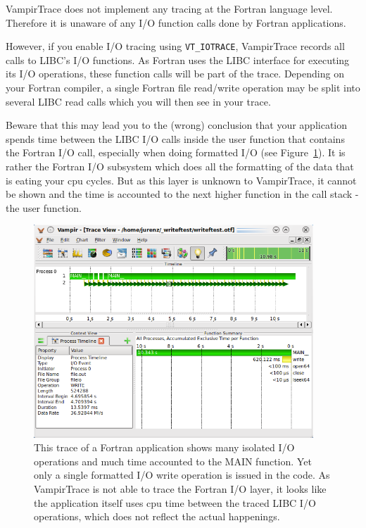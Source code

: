 \documentclass[a4paper,twoside,12pt,BCOR12mm]{scrbook}
\begin{document}
\begin{latexonly}
VampirTrace does not implement any tracing at the Fortran language level.
Therefore it is unaware of any I/O function calls done by Fortran applications.

However, if you enable I/O tracing using \texttt{VT\_IOTRACE}, VampirTrace
records all calls to LIBC's I/O functions. As Fortran uses the LIBC interface
for executing its I/O operations, these function calls will be part of the
trace. Depending on your Fortran compiler, a single Fortran file read/write
operation may be split into several LIBC read calls which you will then see in
your trace.

Beware that this may lead you to the (wrong) conclusion that your application
spends time between the LIBC I/O calls inside the user function that contains
the Fortran I/O call, especially when doing formatted I/O (see
Figure~\ref{fig:fortran_io}). It is rather the Fortran I/O subsystem which does
all the formatting of the data that is eating your cpu cycles. But as this layer
is unknown to VampirTrace, it cannot be shown and the time is accounted to the
next higher function in the call stack - the user function.

\begin{figure}[h]
\begin{center}
\includegraphics[width=10.5cm]{fortran_formatted_io.png}
\end{center}
\caption{This trace of a Fortran application shows many isolated I/O operations
and much time accounted to the MAIN function. Yet only a single formatted I/O
write operation is issued in the code. As VampirTrace is not able to trace the
Fortran I/O layer, it looks like the application itself uses cpu time between
the traced LIBC I/O operations, which does not reflect the actual happenings.}
\label{fig:fortran_io}
\end{figure}


\end{latexonly}
\end{document}
